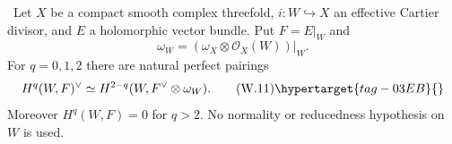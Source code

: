 
\begin{theorem}
\hypertarget{tag-03IY}{}\label{wbII:thm:cartier-duality}


\ Let $X$ be a compact smooth complex threefold,
$i:W\hookrightarrow X$ an effective Cartier divisor, and $E$ a holomorphic
vector bundle.  Put $F=E|_W$ and
\[
\omega_W=(\omega_X\otimes\mathcal O_X(W))|_W.
\]
For $q=0,1,2$ there are natural perfect pairings
\[
H^q(W,F)^\vee
\simeq H^{2-q}(W,F^\vee\otimes\omega_W).
\tag{W.11}\hypertarget{tag-03EB}{}\label{wbII:eq:W:5.11}
\]
Moreover $H^q(W,F)=0$ for $q>2$.  No normality or reducedness hypothesis on
$W$ is used.
\end{theorem}

